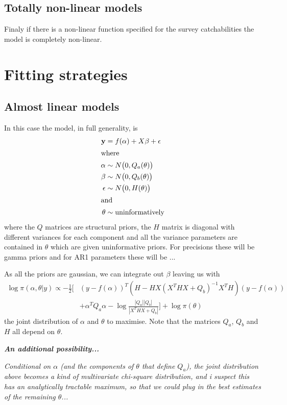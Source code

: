 \documentclass[a4paper,english]{article}
\begin{document}
\subsection{Totally non-linear models}

Finaly if there is a non-linear function specified for the survey catchabilities the model is completely non-linear.

\section{Fitting strategies}

\subsection{Almost linear models}

In this case the model, in full generality, is
\begin{align*}
  \mathbf{y} &= f(\alpha) + X\beta + \epsilon \\
\intertext{where}
  \alpha &\sim N\big(0,Q_a(\theta)\big) \\
  \beta &\sim N\big(0,Q_b(\theta)\big) \\
  \epsilon &\sim N\big(0,H(\theta)\big) \\
\intertext{and}
  \theta &\sim \text{uninformatively}
\end{align*}
where the $Q$ matrices are structural priors, the $H$ matrix is diagonal with different variances for each component and all the variance parameters are contained in $\theta$ which are given uninformative priors.  For precisions these will be gamma priors and for AR1 parameters these will be ...

As all the priors are gaussian, we can integrate out $\beta$ leaving us with
\begin{align*}
  \log \pi(\alpha, \theta | y) \propto 
      -\frac{1}{2} \Big[ &(y - f(\alpha))^T ( H - HX(X^THX + Q_b)^{-1}X^TH) (y - f(\alpha)) \\
      &+ \alpha^T Q_a \alpha - \log \frac{|Q_a||Q_b|}{|X^THX+Q_b|} \Big] + \log \pi(\theta)
\end{align*}
the joint distribution of $\alpha$ and $\theta$ to maximise. Note that the matrices $Q_a$, $Q_b$ and $H$ all depend on $\theta$.

\textbf{\emph{An additional possibility...}}

\emph{Conditional on $\alpha$ (and the components of $\theta$ that define $Q_a$), the joint distribution above becomes a kind of multivariate chi-square distribution, and i suspect this has an analytically tractable maximum, so that we could plug in the best estimates of the remaining $\theta$...}
\end{document}
